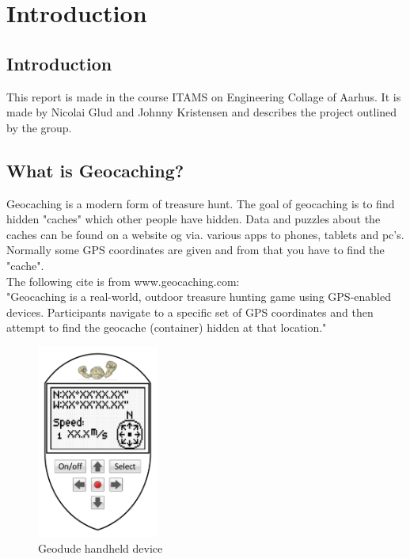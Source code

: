 \chapter{Introduction}


\section{Introduction}
This report is made in the course ITAMS on Engineering Collage of Aarhus. It is made by Nicolai Glud and Johnny Kristensen and describes the project outlined by the group.

\section{What is Geocaching?}
Geocaching is a modern form of treasure hunt. The goal of geocaching is to find hidden "caches" which other people have hidden. Data and puzzles about the caches can be found on a website og via. various apps to phones, tablets and pc's. Normally some GPS coordinates are given and from that you have to find the "cache".\\
The following cite is from www.geocaching.com:\\
"Geocaching is a real-world, outdoor treasure hunting game using GPS-enabled devices. Participants navigate to a specific set of GPS coordinates and then attempt to find the geocache (container) hidden at that location."

\begin{figure}
\vspace{-30pt}
\begin{center}
\includegraphics[width=4cm]{billeder/geodude}
\end{center}
\vspace{-20pt}
\caption{Geodude handheld device}
\vspace{-20pt}
\end{figure}

